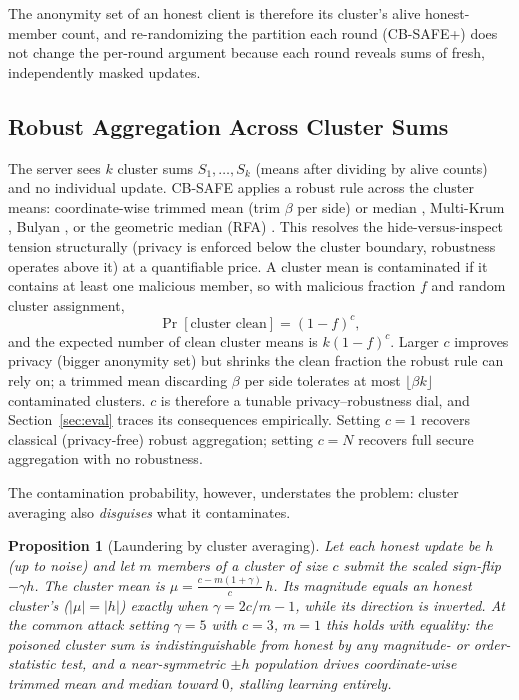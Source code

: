\documentclass[lettersize,journal]{IEEEtran}
\newtheorem{proposition}{Proposition}
\begin{document}
The anonymity set of an honest client is therefore its cluster's alive honest-member
count, and re-randomizing the partition each round (CB-SAFE+) does not change the
per-round argument because each round reveals sums of fresh, independently masked
updates.

\subsection{Robust Aggregation Across Cluster Sums}\label{sec:tradeoff}
The server sees $k$ cluster sums $S_1,\dots,S_k$ (means after dividing by alive
counts) and no individual update. CB-SAFE applies a robust rule across the cluster
means: coordinate-wise trimmed mean (trim $\beta$ per side) or median \cite{yin2018},
Multi-Krum \cite{blanchard2017}, Bulyan \cite{bulyan}, or the geometric median
(RFA) \cite{rfa}. This resolves the hide-versus-inspect tension structurally (privacy
is enforced below the cluster boundary, robustness operates above it) at a
quantifiable price. A cluster mean is contaminated if it contains at least one
malicious member, so with malicious fraction $f$ and random cluster assignment,
\begin{equation}\label{eq:contam}
\Pr[\text{cluster clean}] = (1-f)^{c},
\end{equation}
and the expected number of clean cluster means is $k(1-f)^c$. Larger $c$ improves
privacy (bigger anonymity set) but shrinks the clean fraction the robust rule can
rely on; a trimmed mean discarding $\beta$ per side tolerates at most
$\lfloor \beta k \rfloor$ contaminated clusters. $c$ is therefore a tunable
privacy--robustness dial, and Section~\ref{sec:eval} traces its consequences
empirically. Setting $c{=}1$ recovers classical (privacy-free) robust aggregation;
setting $c{=}N$ recovers full secure aggregation with no robustness.

The contamination probability, however, understates the problem: cluster averaging
also \emph{disguises} what it contaminates.

\begin{proposition}[Laundering by cluster averaging]\label{prop:launder}
Let each honest update be $h$ (up to noise) and let $m$ members of a cluster of size
$c$ submit the scaled sign-flip $-\gamma h$. The cluster mean is
$\mu = \frac{c - m(1+\gamma)}{c}\, h$. Its magnitude equals an honest cluster's
($|\mu| = |h|$) exactly when $\gamma = 2c/m - 1$, while its direction is inverted.
At the common attack setting $\gamma{=}5$ with $c{=}3$, $m{=}1$ this holds with
equality: the poisoned cluster sum is indistinguishable from honest by any
magnitude- or order-statistic test, and a near-symmetric $\pm h$ population drives
coordinate-wise trimmed mean and median toward $0$, stalling learning entirely.
\end{proposition}
\end{document}
